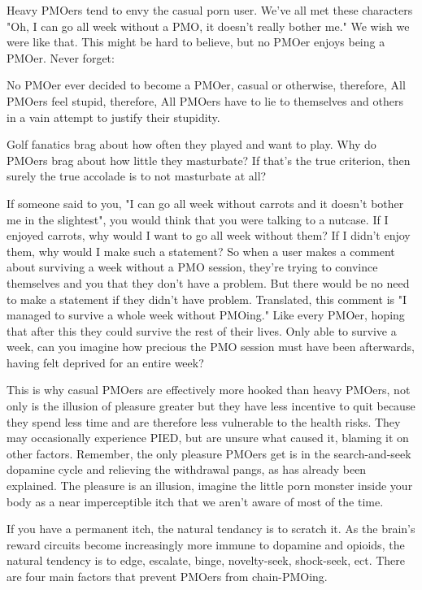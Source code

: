 \documentclass[easypeasy]{subfiles}
\begin{document}
Heavy PMOers tend to envy the casual porn user. We've all met these characters "Oh, I can go all week without a PMO, it doesn't really bother me." We wish we were like that. This might be hard to believe, but no PMOer enjoys being a PMOer. Never forget:

  No PMOer ever decided to become a PMOer, casual or otherwise, therefore,
  All PMOers feel stupid, therefore,
  All PMOers have to lie to themselves and others in a vain attempt to justify their stupidity.

Golf fanatics brag about how often they played and want to play. Why do PMOers brag about how little they masturbate? If that's the true criterion, then surely the true accolade is to not masturbate at all?

If someone said to you, "I can go all week without carrots and it doesn't bother me in the slightest", you would think that you were talking to a nutcase. If I enjoyed carrots, why would I want to go all week without them? If I didn't enjoy them, why would I make such a statement? So when a user makes a comment about surviving a week without a PMO session, they're trying to convince themselves and you that they don't have a problem. But there would be no need to make a statement if they didn't have problem. Translated, this comment is "I managed to survive a whole week without PMOing." Like every PMOer, hoping that after this they could survive the rest of their lives. Only able to survive a week, can you imagine how precious the PMO session must have been afterwards, having felt deprived for an entire week?

This is why casual PMOers are effectively more hooked than heavy PMOers, not only is the illusion of pleasure greater but they have less incentive to quit because they spend less time and are therefore less vulnerable to the health risks. They may occasionally experience PIED, but are unsure what caused it, blaming it on other factors. Remember, the only pleasure PMOers get is in the search-and-seek dopamine cycle and relieving the withdrawal pangs, as has already been explained. The pleasure is an illusion, imagine the little porn monster inside your body as a near imperceptible itch that we aren't aware of most of the time.

If you have a permanent itch, the natural tendancy is to scratch it. As the brain's reward circuits become increasingly more immune to dopamine and opioids, the natural tendency is to edge, escalate, binge, novelty-seek, shock-seek, ect. There are four main factors that prevent PMOers from chain-PMOing.
\end{document}
